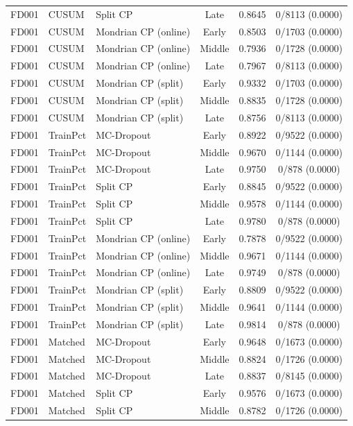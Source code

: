 \begin{table}[t]
\begin{tabular}{lllccc}
FD001 & CUSUM & Split CP & Late & 0.8645 & 0/8113 (0.0000) \\
FD001 & CUSUM & Mondrian CP (online) & Early & 0.8503 & 0/1703 (0.0000) \\
FD001 & CUSUM & Mondrian CP (online) & Middle & 0.7936 & 0/1728 (0.0000) \\
FD001 & CUSUM & Mondrian CP (online) & Late & 0.7967 & 0/8113 (0.0000) \\
FD001 & CUSUM & Mondrian CP (split) & Early & 0.9332 & 0/1703 (0.0000) \\
FD001 & CUSUM & Mondrian CP (split) & Middle & 0.8835 & 0/1728 (0.0000) \\
FD001 & CUSUM & Mondrian CP (split) & Late & 0.8756 & 0/8113 (0.0000) \\
FD001 & TrainPct & MC-Dropout & Early & 0.8922 & 0/9522 (0.0000) \\
FD001 & TrainPct & MC-Dropout & Middle & 0.9670 & 0/1144 (0.0000) \\
FD001 & TrainPct & MC-Dropout & Late & 0.9750 & 0/878 (0.0000) \\
FD001 & TrainPct & Split CP & Early & 0.8845 & 0/9522 (0.0000) \\
FD001 & TrainPct & Split CP & Middle & 0.9578 & 0/1144 (0.0000) \\
FD001 & TrainPct & Split CP & Late & 0.9780 & 0/878 (0.0000) \\
FD001 & TrainPct & Mondrian CP (online) & Early & 0.7878 & 0/9522 (0.0000) \\
FD001 & TrainPct & Mondrian CP (online) & Middle & 0.9671 & 0/1144 (0.0000) \\
FD001 & TrainPct & Mondrian CP (online) & Late & 0.9749 & 0/878 (0.0000) \\
FD001 & TrainPct & Mondrian CP (split) & Early & 0.8809 & 0/9522 (0.0000) \\
FD001 & TrainPct & Mondrian CP (split) & Middle & 0.9641 & 0/1144 (0.0000) \\
FD001 & TrainPct & Mondrian CP (split) & Late & 0.9814 & 0/878 (0.0000) \\
FD001 & Matched & MC-Dropout & Early & 0.9648 & 0/1673 (0.0000) \\
FD001 & Matched & MC-Dropout & Middle & 0.8824 & 0/1726 (0.0000) \\
FD001 & Matched & MC-Dropout & Late & 0.8837 & 0/8145 (0.0000) \\
FD001 & Matched & Split CP & Early & 0.9576 & 0/1673 (0.0000) \\
FD001 & Matched & Split CP & Middle & 0.8782 & 0/1726 (0.0000) \\

\end{tabular}
\end{table}
